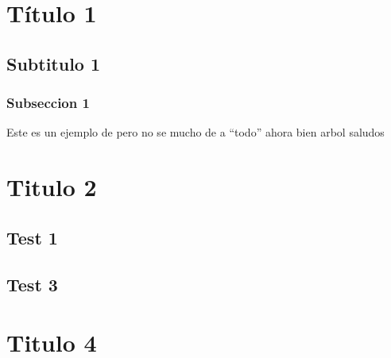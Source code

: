 \section{Título 1}
	\subsection{Subtitulo 1}
		\subsubsection{Subseccion 1}
		
		Este es un ejemplo de  pero no se mucho de  a ``todo'' ahora \codigodelcurso bien arbol \nombredelinforme saludos
		
\section{Titulo 2}
	\vspace{14cm}
	
	\lipsum[1]
	\subsection{Test 1}
	\subsection{Test 3}
	
\clearpage
\section{Titulo 4}
